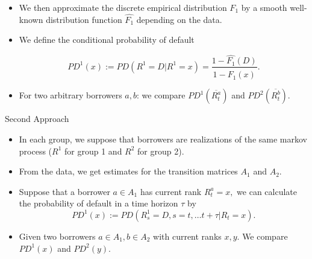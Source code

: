\documentclass[newPxFont,sthlmFooter]{beamer}
\begin{document}
\begin{frame}
\begin{itemize}
\item We then approximate the discrete empirical distribution $F_1$ by a smooth well-known distribution function $\hat{F_1}$ depending on the data.
\item We define the conditional probability of default 
 
$$PD^1(x):=PD(R^1=D|R^1=x)=\frac{1-\hat{F_1}(D)}{1-\hat{F_1}(x)}.$$
\item For two arbitrary borrowers $a, b$: we compare $PD^1(\overline{R_t^a})$ and $PD^2(\overline{R_t^b})$. 
\end{itemize}
\end{frame}

\begin{frame}{Second Approach}
\begin{itemize}
\item In each group, we suppose that borrowers are realizations of the same markov process ($R^1$ for group 1 and $R^2$ for group 2).
\item From the data, we get estimates for the  transition matrices $A_1$ and $A_2.$
\item Suppose that a borrower $a\in A_1$ has current rank $R^a_t=x,$ we can calculate the probability of default in a time horizon $\tau$ by
$$PD^1(x):=PD(R^1_s=D, s=t,\dots t+\tau|R_t=x).$$
\end{itemize}
\end{frame}
\begin{frame}
\begin{itemize}
\item Given two borrowers $a\in A_1, b\in A_2$ with current ranks $x, y$. We compare $PD^1(x)$ and $PD^2(y).$
\end{itemize}
\end{frame}
%
%
%
\end{document}

